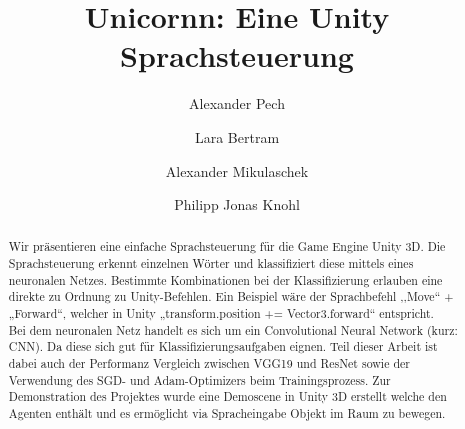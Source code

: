 \documentclass[sigconf]{acmart}
\begin{document}
\title{Unicornn: Eine Unity Sprachsteuerung}

\author{Alexander Pech}

\author{Lara Bertram}

\author{Alexander Mikulaschek}

\author{Philipp Jonas Knohl}

\begin{abstract}
Wir präsentieren eine einfache Sprachsteuerung für die Game Engine Unity 3D. Die Sprachsteuerung erkennt einzelnen Wörter und klassifiziert diese mittels eines neuronalen Netzes. Bestimmte Kombinationen bei der Klassifizierung erlauben eine direkte zu Ordnung zu Unity-Befehlen.  
Ein Beispiel wäre der Sprachbefehl ,,Move“ + „Forward“, welcher in Unity „transform.position += Vector3.forward“ entspricht.\\
Bei dem neuronalen Netz handelt es sich um ein Convolutional Neural Network (kurz: CNN). Da diese sich gut für Klassifizierungsaufgaben eignen. Teil dieser Arbeit ist dabei auch der Performanz Vergleich zwischen VGG19 und ResNet sowie der Verwendung des SGD- und Adam-Optimizers beim Trainingsprozess. 
Zur Demonstration des Projektes wurde eine Demoscene in Unity 3D erstellt welche den Agenten enthält und es ermöglicht via Spracheingabe Objekt im Raum zu bewegen. 
\end{abstract}

\end{document}
